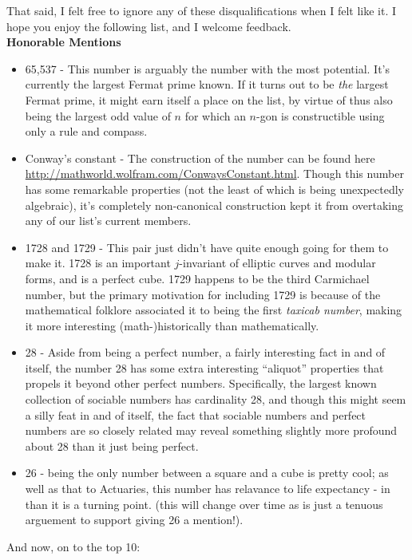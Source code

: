 \documentclass[12pt]{article}
\newcommand{\<}{\langle}
\renewcommand{\>}{\rangle}
\begin{document}
That said, I felt free to ignore any of these disqualifications when I
felt like it.  I hope you enjoy the following list, and I welcome
feedback.\\

\textbf{{\Large Honorable Mentions}}\\
\begin{itemize}
\item 65,537 - This number is arguably the number with the most
potential.  It's currently the largest Fermat prime known.  If it
turns out to be \emph{the} largest Fermat prime, it might earn itself
a place on the list, by virtue of thus also being the largest odd
value of $n$ for which an $n$-gon is constructible using only a rule
and compass.
\item Conway's constant - The construction of the number can be found
here \url{http://mathworld.wolfram.com/ConwaysConstant.html}.  Though
this number has some remarkable properties (not the least of which is
being unexpectedly algebraic), it's completely non-canonical
construction kept it from overtaking any of our list's current
members.
\item 1728 and 1729 - This pair just didn't have quite enough going
  for them to make it.  1728 is an important $j$-invariant of elliptic
  curves and modular forms, and is a perfect cube.  1729 happens to be
  the third Carmichael number, but the primary motivation for
  including 1729 is because of the mathematical folklore associated it
  to being the first \emph{taxicab number}, making it more interesting
  (math-)historically than mathematically.
\item 28 - Aside from being a perfect number, a fairly interesting
  fact in and of itself, the number 28 has some extra interesting
  ``aliquot'' properties that propels it beyond other perfect numbers.
  Specifically, the largest known collection of sociable numbers has
  cardinality 28, and though this might seem a silly feat in and of
  itself, the fact that sociable numbers and perfect numbers are
  so closely related may reveal something slightly more profound about
  28 than it just being perfect.
\item 26 - being the only number between a square and a cube is pretty cool; as well as that to Actuaries, this number has relavance to life expectancy - in than it is a turning point. (this will change over time as is just a tenuous arguement to support giving 26 a mention!).
\end{itemize}
And now, on to the top 10:
\end{document}
